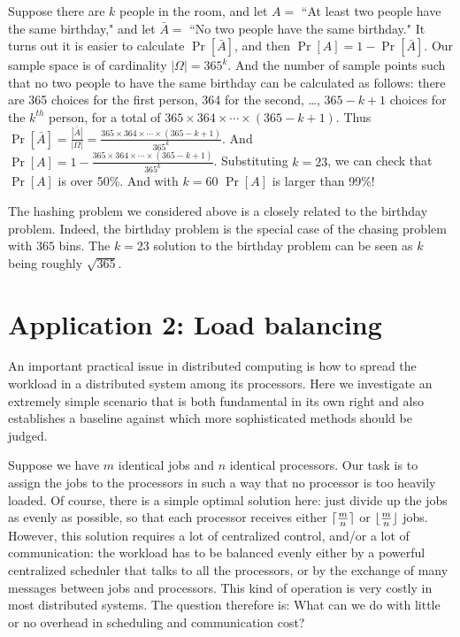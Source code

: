 \documentclass[11pt]{article}
\begin{document}
Suppose there are $k$ people in the room, and let $A = $ ``At least
two people have the same birthday," and let ${\bar A} = $ ``No two people have the same birthday." 
It turns out it is easier to calculate $\Pr[{\bar A}]$, and then $\Pr[A] = 1 - \Pr[{\bar A}]$.
Our sample space is of cardinality $|\Omega| = 365^k$. And the number of sample points such 
that no two people to have the same birthday can be calculated as follows: 
there are 365 choices for the first person,
364 for the second, \ldots, $365-k+1$ choices for the $k^{th}$ person, for a total of
$365 \times 364 \times \cdots \times (365-k+1)$. 
Thus $\Pr[{\bar A}] = \frac{|{\bar A}|}{|\Omega|} =
\frac{365 \times 364 \times \cdots \times (365-k+1)}{365^k}$. And
$\Pr[A] = 1 - \frac{365 \times 364 \times \cdots \times (365-k+1)}{365^k}$.  
Substituting $k=23$, we can check that $\Pr[A]$ is over 50\%.
And with $k=60$ $\Pr[A]$ is larger than 99\%!

The hashing problem we considered above is a closely related
to the birthday problem. Indeed, the birthday problem is the special 
case of the chasing problem with $365$ bins. The $k = 23$ solution 
to the birthday problem can be seen as $k$ being roughly $\sqrt{365}$. 




\section*{Application 2: Load balancing}
An important practical issue in distributed computing
is how to spread the workload in a distributed system among its
processors. 
Here we investigate an extremely simple scenario that is both fundamental 
in its own right and also establishes a baseline against which more
sophisticated methods should be judged.

Suppose we have $m$ identical jobs and $n$ identical processors.
Our task is to assign the jobs to the processors in such a way that
no processor is too heavily loaded.  Of course, there is a simple
optimal solution here: just divide up the jobs as evenly as possible,
so that each processor receives either $\lceil{m\over n}\rceil$
or $\lfloor{m\over n}\rfloor$ jobs.  However, this solution requires
a lot of centralized control, and/or a lot of communication: the
workload has to be balanced evenly either by a powerful centralized
scheduler that talks to all the processors, or by the exchange of
many messages between jobs and processors.  This kind of operation
is very costly in most distributed systems.  The question therefore
is: What can we do with little or no overhead in scheduling and
communication cost?
\end{document}

